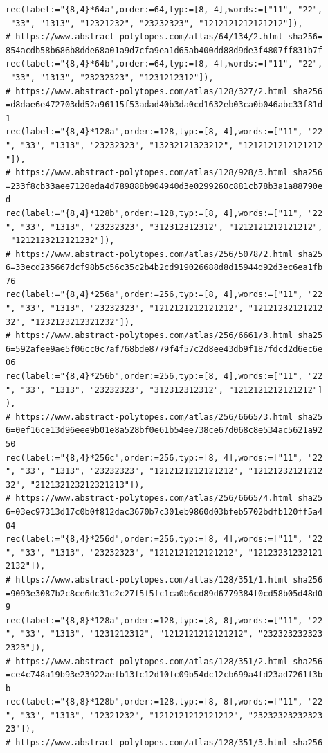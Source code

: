 \documentclass[
  11pt,
  a4paper,
]{article}
\begin{document}
\begin{verbatim}
rec(label:="{8,4}*64a",order:=64,typ:=[8, 4],words:=["11", "22",
 "33", "1313", "12321232", "23232323", "1212121212121212"]),
# https://www.abstract-polytopes.com/atlas/64/134/2.html sha256=
854acdb58b686b8dde68a01a9d7cfa9ea1d65ab400dd88d9de3f4807ff831b7f
rec(label:="{8,4}*64b",order:=64,typ:=[8, 4],words:=["11", "22",
 "33", "1313", "23232323", "1231212312"]),
# https://www.abstract-polytopes.com/atlas/128/327/2.html sha256
=d8dae6e472703dd52a96115f53adad40b3da0cd1632eb03ca0b046abc33f81d
1
rec(label:="{8,4}*128a",order:=128,typ:=[8, 4],words:=["11", "22
", "33", "1313", "23232323", "13232121323212", "1212121212121212
"]),
# https://www.abstract-polytopes.com/atlas/128/928/3.html sha256
=233f8cb33aee7120eda4d789888b904940d3e0299260c881cb78b3a1a88790e
d
rec(label:="{8,4}*128b",order:=128,typ:=[8, 4],words:=["11", "22
", "33", "1313", "23232323", "312312312312", "1212121212121212",
 "1212123212121232"]),
# https://www.abstract-polytopes.com/atlas/256/5078/2.html sha25
6=33ecd235667dcf98b5c56c35c2b4b2cd919026688d8d15944d92d3ec6ea1fb
76
rec(label:="{8,4}*256a",order:=256,typ:=[8, 4],words:=["11", "22
", "33", "1313", "23232323", "1212121212121212", "12121232121212
32", "1232123212321232"]),
# https://www.abstract-polytopes.com/atlas/256/6661/3.html sha25
6=592afee9ae5f06cc0c7af768bde8779f4f57c2d8ee43db9f187fdcd2d6ec6e
06
rec(label:="{8,4}*256b",order:=256,typ:=[8, 4],words:=["11", "22
", "33", "1313", "23232323", "312312312312", "1212121212121212"]
),
# https://www.abstract-polytopes.com/atlas/256/6665/3.html sha25
6=0ef16ce13d96eee9b01e8a528bf0e61b54ee738ce67d068c8e534ac5621a92
50
rec(label:="{8,4}*256c",order:=256,typ:=[8, 4],words:=["11", "22
", "33", "1313", "23232323", "1212121212121212", "12121232121212
32", "212132123212321213"]),
# https://www.abstract-polytopes.com/atlas/256/6665/4.html sha25
6=03ec97313d17c0b0f812dac3670b7c301eb9860d03bfeb5702bdfb120ff5a4
04
rec(label:="{8,4}*256d",order:=256,typ:=[8, 4],words:=["11", "22
", "33", "1313", "23232323", "1212121212121212", "12123231232121
2132"]),
# https://www.abstract-polytopes.com/atlas/128/351/1.html sha256
=9093e3087b2c8ce6dc31c2c27f5f5fc1ca0b6cd89d6779384f0cd58b05d48d0
9
rec(label:="{8,8}*128a",order:=128,typ:=[8, 8],words:=["11", "22
", "33", "1313", "1231212312", "1212121212121212", "232323232323
2323"]),
# https://www.abstract-polytopes.com/atlas/128/351/2.html sha256
=ce4c748a19b93e23922aefb13fc12d10fc09b54dc12cb699a4fd23ad7261f3b
b
rec(label:="{8,8}*128b",order:=128,typ:=[8, 8],words:=["11", "22
", "33", "1313", "12321232", "1212121212121212", "23232323232323
23"]),
# https://www.abstract-polytopes.com/atlas/128/351/3.html sha256

\end{verbatim}
\end{document}
